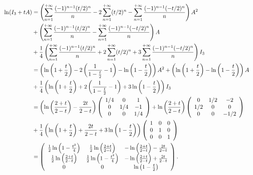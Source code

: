 {{\begin{align*}\ensuremath
\ln(I_3+tA)&=\left(\sum_{n=1}^{+\infty} \frac{(-1)^{n-1}(t/2)^n}{n}-2\sum_{n=1}^{+\infty}(t/2)^n-\sum_{n=1}^{+\infty} \frac{(-1)^{n-1}(-t/2)^n}{n}\right)A^2\\
 &+\left(\sum_{n=1}^{+\infty} \frac{(-1)^{n-1}(t/2)^n}{n}-\sum_{n=1}^{+\infty} \frac{(-1)^{n-1}(-t/2)^n}{n}\right)A\\
  &+ \frac{1}{4}\left(\sum_{n=1}^{+\infty} \frac{(-1)^{n-1}(t/2)^n}{n}+2\sum_{n=1}^{+\infty}(t/2)^n+3\sum_{n=1}^{+\infty} \frac{(-1)^{n-1}(-t/2)^n}{n}\right)I_3\\
  &=\left(\ln\left(1+ \frac{t}{2}\right)-2\left( \frac{1}{1- \frac{t}{2}}-1\right)-\ln\left(1- \frac{t}{2}\right)\right)A^2+\left(\ln\left(1+ \frac{t}{2}\right)-\ln\left(1- \frac{t}{2}\right)\right)A\\
  &+ \frac{1}{4}\left(\ln\left(1+ \frac{t}{2}\right)+2\left( \frac{1}{1- \frac{t}{2}}-1\right)+3\ln\left(1- \frac{t}{2}\right)\right)I_3\\
  &=\left(\ln\left( \frac{2+t}{2-t}\right)- \frac{2t}{2-t}\right)\left(
\begin{array}{ccc}
1/4&0&1\\
0&1/4&-1\\
0&0&1/4
\end{array}
\right)+\ln\left( \frac{2+t}{2-t}\right)\left(
\begin{array}{ccc}
0&1/2&-2\\
1/2&0&0\\
0&0&-1/2
\end{array}
\right)\\
  &+ \frac{1}{4}\left(\ln\left(1+ \frac{t}{2}\right)+ \frac{2t}{2-t}+3\ln\left(1- \frac{t}{2}\right)\right)\left(
\begin{array}{ccc}
1&0&0\\
0&1&0\\
0&0&1
\end{array}
\right)\\
 &=\left(
 \begin{array}{ccc}
 \frac{1}{2}\ln\left(1- \frac{t^2}{4}\right)& \frac{1}{2}\ln\left( \frac{2+t}{2-t}\right)&-\ln\left( \frac{2+t}{2-t}\right)- \frac{2t}{2-t}\\
 \frac{1}{2}\ln\left( \frac{2+t}{2-t}\right)& \frac{1}{2}\ln\left(1- \frac{t^2}{4}\right)&-\ln\left( \frac{2+t}{2-t}\right)+ \frac{2t}{2-t}\\
 0&0&\ln\left(1- \frac{t}{2}\right)
 \end{array}
 \right).
\end{align*}

\begin{center}
\shadowbox{
$\forall t\in]-2,2[$, $\ln(I_3+tA)=\left(
 \begin{array}{ccc}
 \frac{1}{2}\ln\left(1- \frac{t^2}{4}\right)& \frac{1}{2}\ln\left( \frac{2+t}{2-t}\right)&-\ln\left( \frac{2+t}{2-t}\right)- \frac{2t}{2-t}\\
 \frac{1}{2}\ln\left( \frac{2+t}{2-t}\right)& \frac{1}{2}\ln\left(1- \frac{t^2}{4}\right)&-\ln\left( \frac{2+t}{2-t}\right)+ \frac{2t}{2-t}\\
 0&0&\ln\left(1- \frac{t}{2}\right)
 \end{array}
 \right)$.
}
\end{center}
}
}
